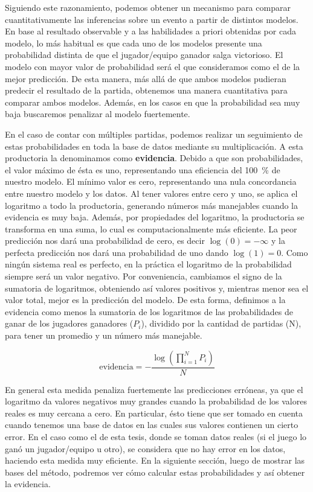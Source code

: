 \documentclass[11pt,twoside,spanish]{report} %
\begin{document}
Siguiendo este razonamiento, podemos obtener un mecanismo para comparar cuantitativamente las inferencias sobre un evento a partir de distintos modelos.
En base al resultado observable y a las habilidades a priori obtenidas por cada modelo, lo m\'as habitual es que cada uno de los modelos presente una probabilidad distinta de que el jugador/equipo ganador salga victorioso.
El modelo con mayor valor de probabilidad ser\'a el que consideramos como el de la mejor predicci\'on. De esta manera, m\'as all\'a de que ambos modelos pudieran predecir el resultado de la partida, obtenemos una manera cuantitativa para comparar ambos modelos.
Adem\'as, en los casos en que la probabilidad sea muy baja buscaremos penalizar al modelo fuertemente.

En el caso de contar con m\'ultiples partidas, podemos realizar un seguimiento de estas probabilidades en toda la base de datos mediante su multiplicaci\'on.
A esta productoria la denominamos como \textbf{evidencia}.
Debido a que son probabilidades, el valor m\'aximo de \'esta es uno, representando una eficiencia del \SI{100}{\percent} de nuestro modelo.
El m\'inimo valor es cero, representando una nula concordancia entre nuestro modelo y los datos.
Al tener valores entre cero y uno, se aplica el logaritmo a todo la productoria, generando n\'umeros m\'as manejables cuando la evidencia es muy baja.
Adem\'as, por propiedades del logaritmo, la productoria se transforma en una suma, lo cual es computacionalmente m\'as eficiente.
La peor predicci\'on nos dar\'a una probabilidad de cero, es decir $\log(0)=-\infty$ y la perfecta predicci\'on nos dar\'a una probabilidad de uno dando $\log(1)=0$.
Como ning\'un sistema real es perfecto, en la pr\'actica el logaritmo de la probabilidad siempre ser\'a un valor negativo.
Por conveniencia, cambiamos el signo de la sumatoria de logaritmos, obteniendo as\'i valores positivos y, mientras menor sea el valor total, mejor es la predicci\'on del modelo.
De esta forma, definimos a la evidencia como menos la sumatoria de los logaritmos de las probabilidades de ganar de los jugadores ganadores ($P_i$), dividido por la cantidad de partidas (N), para tener un promedio y un n\'umero m\'as manejable.

\begin{equation}
	\text{evidencia} = -\frac{\log(\prod_{i=1}^{N}P_i)}{N}
\end{equation}

En general esta medida penaliza fuertemente las predicciones err\'oneas, ya que el logaritmo da valores negativos muy grandes cuando la probabilidad de los valores reales es muy cercana a cero.
En particular, \'esto tiene que ser tomado en cuenta cuando tenemos una base de datos en las cuales sus valores contienen un cierto error.
En el caso como el de esta tesis, donde se toman datos reales (si el juego lo gan\'o un jugador/equipo u otro), se considera que no hay error en los datos, haciendo esta medida muy eficiente.
En la siguiente secci\'on, luego de mostrar las bases del m\'etodo, podremos ver c\'omo calcular estas probabilidades y as\'i obtener la evidencia.
\end{document}
